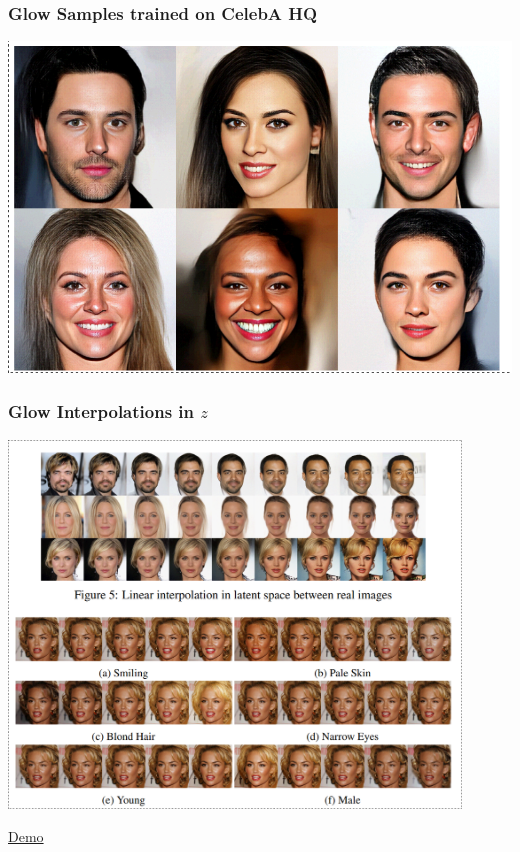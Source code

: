 \documentclass{beamer}
\begin{document}
\begin{frame}
  \frametitle{Glow Samples trained on CelebA HQ}

  \includegraphics[width=1.0\textwidth]{glow-samples.png}
\end{frame}

\begin{frame}
  \frametitle{Glow Interpolations in $z$}

  \includegraphics[width=0.9\textwidth]{glow-interpolations.png}
\end{frame}

\begin{frame}
  \begin{center}
    \Huge \href{https://openai.com/blog/glow/}{Demo}
  \end{center}
\end{frame}
\end{document}
